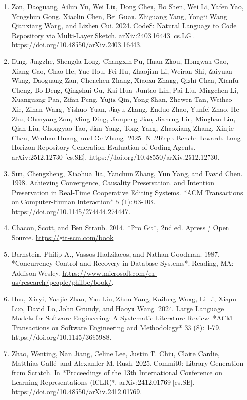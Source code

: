 \documentclass[9pt,letterpaper]{extarticle}
\begin{document}
\begin{enumerate}
\item \label{ref:26} Zan, Daoguang, Ailun Yu, Wei Liu, Dong Chen, Bo Shen, Wei Li, Yafen Yao, Yongshun Gong, Xiaolin Chen, Bei Guan, Zhiguang Yang, Yongji Wang, Qianxiang Wang, and Lizhen Cui. 2024. {}CodeS: Natural Language to Code Repository via Multi-Layer Sketch.{} arXiv:2403.16443 [cs.LG]. \url{https://doi.org/10.48550/arXiv.2403.16443}.
\item \label{ref:27} Ding, Jingzhe, Shengda Long, Changxin Pu, Huan Zhou, Hongwan Gao, Xiang Gao, Chao He, Yue Hou, Fei Hu, Zhaojian Li, Weiran Shi, Zaiyuan Wang, Daoguang Zan, Chenchen Zhang, Xiaoxu Zhang, Qizhi Chen, Xianfu Cheng, Bo Deng, Qingshui Gu, Kai Hua, Juntao Lin, Pai Liu, Mingchen Li, Xuanguang Pan, Zifan Peng, Yujia Qin, Yong Shan, Zhewen Tan, Weihao Xie, Zihan Wang, Yishuo Yuan, Jiayu Zhang, Enduo Zhao, Yunfei Zhao, He Zhu, Chenyang Zou, Ming Ding, Jianpeng Jiao, Jiaheng Liu, Minghao Liu, Qian Liu, Chongyao Tao, Jian Yang, Tong Yang, Zhaoxiang Zhang, Xinjie Chen, Wenhao Huang, and Ge Zhang. 2025. {}NL2Repo-Bench: Towards Long-Horizon Repository Generation Evaluation of Coding Agents.{} arXiv:2512.12730 [cs.SE]. \url{https://doi.org/10.48550/arXiv.2512.12730}.
\item \label{ref:28} Sun, Chengzheng, Xiaohua Jia, Yanchun Zhang, Yun Yang, and David Chen. 1998. {}Achieving Convergence, Causality Preservation, and Intention Preservation in Real-Time Cooperative Editing Systems.{} *ACM Transactions on Computer-Human Interaction* 5 (1): 63-108. \url{https://doi.org/10.1145/274444.274447}.
\item \label{ref:29} Chacon, Scott, and Ben Straub. 2014. *Pro Git*, 2nd ed. Apress / Open Source. \url{https://git-scm.com/book}.
\item \label{ref:30} Bernstein, Philip A., Vassos Hadzilacos, and Nathan Goodman. 1987. *Concurrency Control and Recovery in Database Systems*. Reading, MA: Addison-Wesley. \url{https://www.microsoft.com/en-us/research/people/philbe/book/}.
\item \label{ref:31} Hou, Xinyi, Yanjie Zhao, Yue Liu, Zhou Yang, Kailong Wang, Li Li, Xiapu Luo, David Lo, John Grundy, and Haoyu Wang. 2024. {}Large Language Models for Software Engineering: A Systematic Literature Review.{} *ACM Transactions on Software Engineering and Methodology* 33 (8): 1-79. \url{https://doi.org/10.1145/3695988}.
\item \label{ref:32} Zhao, Wenting, Nan Jiang, Celine Lee, Justin T. Chiu, Claire Cardie, Matthias Gallé, and Alexander M. Rush. 2025. {}Commit0: Library Generation from Scratch.{} In *Proceedings of the 13th International Conference on Learning Representations (ICLR)*. arXiv:2412.01769 [cs.SE]. \url{https://doi.org/10.48550/arXiv.2412.01769}.

\end{enumerate}
\end{document}
